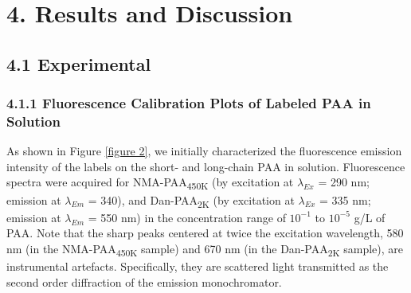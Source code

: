 \documentclass[journal=mamobx,manuscript=article]{achemso}
\begin{document}
\section{4. Results and Discussion}

\subsection{4.1 Experimental}

\subsubsection{4.1.1 Fluorescence Calibration Plots of Labeled PAA in Solution}

As shown in Figure \ref{figure 2}, we initially characterized the fluorescence emission intensity of the labels on the short- and long-chain PAA in solution.  Fluorescence spectra
were acquired for NMA-PAA\textsubscript{450K} (by excitation at $\lambda_{Ex}$ = 290 nm; emission at $\lambda_{Em}$ = 340),\cite{Anghel1998} and Dan-PAA\textsubscript{2K} (by excitation at $\lambda_{Ex}$ = 335 nm; emission at $\lambda_{Em}$ = 550 nm)\cite{Bednar1985} in the concentration range of $10^{-1}$ to $10^{-5}$ g/L of PAA.  Note that the sharp peaks centered at twice the excitation wavelength, 580 nm (in the NMA-PAA\textsubscript{450K} sample) and 670 nm (in the Dan-PAA\textsubscript{2K} sample), are instrumental artefacts.  Specifically, they are scattered light transmitted as the second order diffraction of the emission monochromator. 
\end{document}
